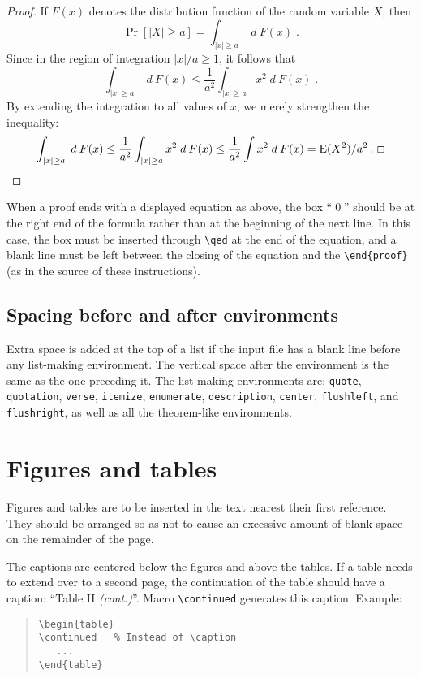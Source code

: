\documentclass{DIKU-report}[2006/05/09]
\begin{document}
\begin{proof}
If $F(x)$ denotes the distribution function of the random variable
$X$, then
\[
\Pr[|X|\ge a] = \int_{|x|\ge a} \;d\:F(x)\;.
\]
Since in the region of integration $|x|/a\ge1$, it follows that
\[
\int_{|x|\ge a} \;d\:F(x) \le \frac{1}{a^2}
\int_{|x|\ge a} x^2\;d\:F(x)\;.
\]
By extending the integration to all values of $x$, we merely
strengthen the inequality:
\[
\int_{|x|\ge a} \;d\:F(x) \le
\frac{1}{a^2} \int_{|x|\ge a} x^2\;d\:F(x) \le
\frac{1}{a^2} \int x^2\;d\:F(x) = 
\mbox{\rm E}(X^2)/a^2\:.\; \qed
\]

\end{proof}

When a proof ends with a displayed equation as above, the box ``\qed''
should be at the right end of the formula rather than at the beginning
of the next line.  In this case, the box must be inserted through
\verb|\qed| at the end of the equation, and a blank line must be left
between the closing of the equation and the \verb|\end{proof}| (as in
the source of these instructions).

\subsection{Spacing before and after environments}

Extra space is added at the top of a list if the input file has a
blank line before any list-making environment.  The vertical space
after the environment is the same as the one preceding it.  The
list-making environments are: \texttt{quote}, \texttt{quotation},
\texttt{verse}, \texttt{itemize}, \texttt{enumerate},
\texttt{description}, \texttt{center}, \texttt{flushleft}, and
\texttt{flushright}, as well as all the theorem-like environments.

\section{Figures and tables}

Figures and tables are to be inserted in the text nearest their first
reference.  They should be arranged so as not to cause an excessive
amount of blank space on the remainder of the page.

The captions are centered below the figures and above the tables.
If a table needs to extend over to a second page, the continuation of the
table should have a caption: ``Table II \emph{(cont.)}''.
Macro \verb|\continued| generates this caption.
Example:
\begin{quote}
   \verb|\begin{table}|\\
   \verb|\continued   % Instead of \caption|\\
   \verb|   ...|\\
   \verb|\end{table}|
\end{quote}
\end{document}
